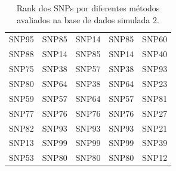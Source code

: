 \begin{table}[ht]
\begin{tabular}{lllll}
  SNP95 & SNP85 & SNP14 & SNP85 & SNP60 \\ 
  SNP88 & SNP14 & SNP85 & SNP14 & SNP40 \\ 
  SNP75 & SNP38 & SNP57 & SNP38 & SNP93 \\ 
  SNP80 & SNP64 & SNP38 & SNP64 & SNP23 \\ 
  SNP59 & SNP57 & SNP64 & SNP57 & SNP81 \\ 
  SNP77 & SNP76 & SNP76 & SNP76 & SNP27 \\ 
  SNP82 & SNP93 & SNP93 & SNP93 & SNP21 \\ 
  SNP13 & SNP99 & SNP99 & SNP99 & SNP39 \\ 
  SNP53 & SNP80 & SNP80 & SNP80 & SNP12 \\ 
   \hline
\end{tabular}
\caption{Rank dos SNPs por diferentes métodos avaliados na base de dados simulada 2.} 
\label{tab:ranks}
\end{table}
